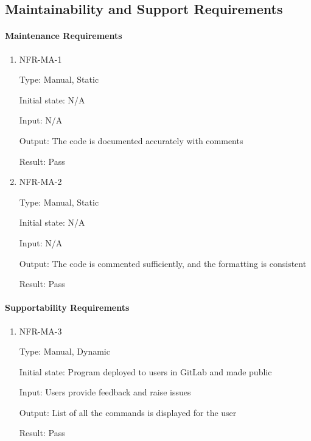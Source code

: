 \documentclass[12pt, titlepage]{article}
\begin{document}
\subsection{Maintainability and Support Requirements}

\paragraph{Maintenance Requirements}

\begin{enumerate}

\item{NFR-MA-1\\}

Type: Manual, Static 

Initial state: N/A 

Input: N/A 

Output: The code is documented accurately with comments 

Result: Pass

\item{NFR-MA-2\\}

Type: Manual, Static 

Initial state: N/A 

Input: N/A 

Output: The code is commented sufficiently, and the formatting is consistent

Result: Pass

\end{enumerate}

\paragraph{Supportability Requirements}

\begin{enumerate}

\item{NFR-MA-3\\}

Type: Manual, Dynamic 

Initial state: Program deployed to users in GitLab and made public 

Input: Users provide feedback and raise issues 

Output: List of all the commands is displayed for the user 

Result: Pass

\end{enumerate}
\end{document}
